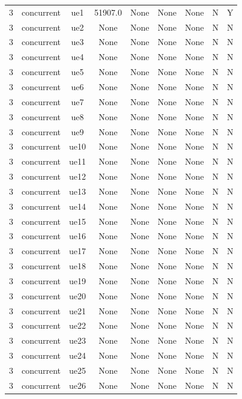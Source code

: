 \begin{table}[ht]
\begin{tabular}{|c|c|c|c|c|c|c|c|c|}
\hline
3 & concurrent & ue1 & 51907.0 & None & None & None & N & Y \\
3 & concurrent & ue2 & None & None & None & None & N & N \\
3 & concurrent & ue3 & None & None & None & None & N & N \\
3 & concurrent & ue4 & None & None & None & None & N & N \\
3 & concurrent & ue5 & None & None & None & None & N & N \\
3 & concurrent & ue6 & None & None & None & None & N & N \\
3 & concurrent & ue7 & None & None & None & None & N & N \\
3 & concurrent & ue8 & None & None & None & None & N & N \\
3 & concurrent & ue9 & None & None & None & None & N & N \\
3 & concurrent & ue10 & None & None & None & None & N & N \\
3 & concurrent & ue11 & None & None & None & None & N & N \\
3 & concurrent & ue12 & None & None & None & None & N & N \\
3 & concurrent & ue13 & None & None & None & None & N & N \\
3 & concurrent & ue14 & None & None & None & None & N & N \\
3 & concurrent & ue15 & None & None & None & None & N & N \\
3 & concurrent & ue16 & None & None & None & None & N & N \\
3 & concurrent & ue17 & None & None & None & None & N & N \\
3 & concurrent & ue18 & None & None & None & None & N & N \\
3 & concurrent & ue19 & None & None & None & None & N & N \\
3 & concurrent & ue20 & None & None & None & None & N & N \\
3 & concurrent & ue21 & None & None & None & None & N & N \\
3 & concurrent & ue22 & None & None & None & None & N & N \\
3 & concurrent & ue23 & None & None & None & None & N & N \\
3 & concurrent & ue24 & None & None & None & None & N & N \\
3 & concurrent & ue25 & None & None & None & None & N & N \\
3 & concurrent & ue26 & None & None & None & None & N & N \\

\end{tabular}
\end{table}
